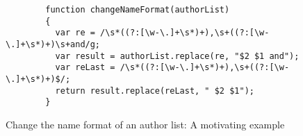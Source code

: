 \begin{figure*}[htbp]
\begin{center}
{
\begin{verbatim}
		function changeNameFormat(authorList)
		{
		  var re = /\s*((?:[\w-\.]+\s*)+),\s+((?:[\w-\.]+\s*)+)\s+and/g;
		  var result = authorList.replace(re, "$2 $1 and");
		  var reLast = /\s*((?:[\w-\.]+\s*)+),\s+((?:[\w-\.]+\s*)+)$/;
		  return result.replace(reLast, " $2 $1");
		}
\end{verbatim}
}
\end{center}
\caption{Change the name format of an author list: A motivating example}
\label{fig-run-exmp}
\end{figure*}
